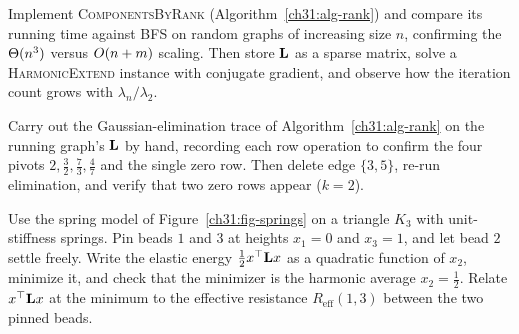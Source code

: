 \begin{exercise}\label{ch31:ex-implement}
Implement \textsc{ComponentsByRank} (Algorithm~\ref{ch31:alg-rank}) and compare its running time against BFS on random graphs of increasing size $n$, confirming the $\Theta(n^3)$ versus $O(n+m)$ scaling. Then store $\mathbf{L}$ as a sparse matrix, solve a \textsc{HarmonicExtend} instance with conjugate gradient, and observe how the iteration count grows with $\lambda_n/\lambda_2$.
\end{exercise}

\begin{exercise}\label{ch31:ex-elim-trace}
Carry out the Gaussian-elimination trace of Algorithm~\ref{ch31:alg-rank} on the running graph's $\mathbf{L}$ by hand, recording each row operation to confirm the four pivots $2,\tfrac32,\tfrac73,\tfrac47$ and the single zero row. Then delete edge $\{3,5\}$, re-run elimination, and verify that two zero rows appear ($k=2$).
\end{exercise}

\begin{exercise}\label{ch31:ex-springs}
Use the spring model of Figure~\ref{ch31:fig-springs} on a triangle $K_3$ with unit-stiffness springs. Pin beads $1$ and $3$ at heights $x_1 = 0$ and $x_3 = 1$, and let bead $2$ settle freely. Write the elastic energy $\tfrac12 x^\top\mathbf{L} x$ as a quadratic function of $x_2$, minimize it, and check that the minimizer is the harmonic average $x_2=\tfrac12$. Relate $x^\top\mathbf{L} x$ at the minimum to the effective resistance $R_{\mathrm{eff}}(1,3)$ between the two pinned beads.
\end{exercise}

